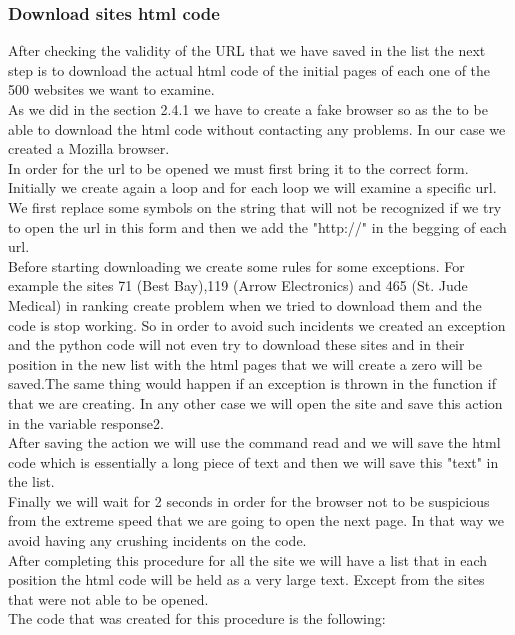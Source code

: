 \documentclass{article}
\begin{document}
\subsubsection{Download sites html code}
After checking the validity of the URL that we have saved in the list the next step is to download the actual html code of the initial pages of each one of the 500 websites we want to examine.\\
As we did in the section 2.4.1 we have to create a fake browser so as the to be able to download the html code without contacting any problems. In our case we created a Mozilla browser.\\
In order for the url to be opened we must first bring it to the correct form. Initially we create again a loop and for each loop we will examine a specific url. We first replace some symbols on the string that will not be recognized if we try to open the url in this form and then we add the "http://" in the begging of each url.\\ 
Before starting downloading we create some rules for some exceptions. For example the sites 71 (Best Bay),119 (Arrow Electronics) and 465 (St. Jude Medical) in ranking create problem when we tried to download them and the code is stop working. So in order to avoid such incidents we created an exception and the python code will not even try to download these sites and in their position in the new list with the html pages that we will create a zero will be saved.The same thing would happen if an exception is thrown in the function if that we are creating. In any other case we will open the site and save this action in the variable response2.\\
After saving the action we will use the command read and we will save the html code which is essentially a long piece of text and then we will save this "text" in the list.\\
Finally we will wait for 2 seconds in order for the browser not to be suspicious from the extreme speed that we are going to open the next page. In that way we avoid having any crushing incidents on the code.\\
After completing this procedure for all the site we will have a list that in each position the html code will be held as a very large text. Except from the sites that were not able to be opened.\\
The code that was created for this procedure is the following:
\end{document}
